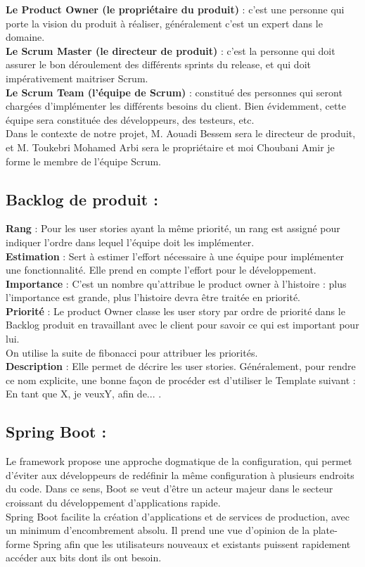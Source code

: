 \documentclass{article}
\begin{document}
\textbf{Le Product Owner (le propriétaire du produit)} : c’est une personne qui porte la vision du produit à réaliser, généralement c’est un expert dans le domaine.\\
\label{sec:hello1}
\textbf{Le Scrum Master (le directeur de produit) } : c'est la personne qui doit assurer le bon déroulement des différents sprints du release, et qui doit impérativement maitriser Scrum. \\

\textbf{Le Scrum Team (l’équipe de Scrum)} : constitué des personnes qui seront chargées d’implémenter les différents besoins du client. Bien évidemment, cette équipe sera constituée des développeurs, des testeurs, etc.\\
Dans le contexte de notre projet, M. Aouadi Bessem sera le directeur de produit, et M. Toukebri Mohamed Arbi sera le propriétaire et moi Choubani Amir  je forme le membre de l’équipe Scrum.
\subsection*{Backlog de produit : }
\textbf{Rang} : Pour les user stories ayant la même priorité, un rang est assigné pour indiquer l'ordre dans lequel l'équipe doit les implémenter.\\
\textbf{Estimation} : Sert à estimer l’effort nécessaire à une équipe pour implémenter une fonctionnalité. Elle prend en compte l’effort pour le développement.\\
\textbf{Importance} : C’est un nombre qu'attribue le product owner à l'histoire : plus l'importance est grande, plus l'histoire devra être traitée en priorité.\\
\textbf{Priorité} : Le product Owner classe les user story par ordre de priorité dans le Backlog produit en travaillant avec le client pour savoir ce qui est important pour lui.\\
On utilise la suite de fibonacci pour attribuer les priorités.\\ 
\textbf{Description} : Elle permet de décrire les user stories. Généralement, pour rendre ce nom explicite, une bonne façon de procéder est d'utiliser le Template suivant :  \guillemotleft En tant que X, je veuxY, afin de... \guillemotright. \\
\label{sec:hello2}
\subsection*{Spring Boot : }
 Le framework propose une approche dogmatique de la configuration, qui permet d'éviter aux développeurs de redéfinir la même configuration à plusieurs endroits du code. Dans ce sens, Boot se veut d'être un acteur majeur dans le secteur croissant du développement d'applications rapide.\\
Spring Boot facilite la création d'applications et de services de production, avec un minimum d'encombrement absolu. Il prend une vue d'opinion de la plate-forme Spring afin que les utilisateurs nouveaux et existants puissent rapidement accéder aux bits dont ils ont besoin.
\label{sec:hello3}
\end{document}
